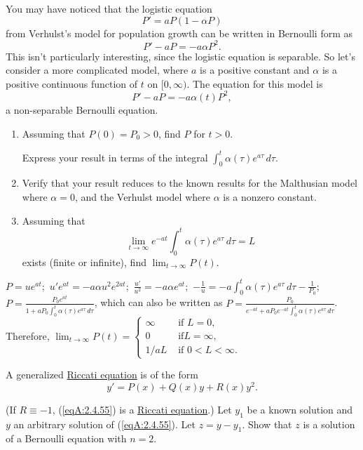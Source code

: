 \documentclass{ximera}
\begin{document}
\begin{problem}\label{exer:2.4.14}
You may have noticed that the logistic equation
$$
P'=aP(1-\alpha P)
$$
from Verhulst's model for population growth can be written in
Bernoulli form as
$$
P'-aP=-a\alpha P^2.
$$
This isn't particularly interesting, since the logistic equation is
separable. So let's consider a more complicated model,
where
$a$ is a positive constant and $\alpha$ is a positive continuous
function of $t$ on $[0,\infty)$. The equation for this model is
$$
P'-aP=-a\alpha(t) P^2,
$$
a non-separable Bernoulli equation.
\begin{enumerate}
\item %
Assuming that $P(0)=P_0>0$, find $P$ for $t>0$. 
\begin{hint}
Express your result in terms of the integral
 $\int_0^t\alpha(\tau)e^{a\tau}\,d\tau$.
 \end{hint}
\item %
Verify that your result reduces to the known results
for the Malthusian model where  $\alpha=0$, and the Verhulst model
where $\alpha$ is a nonzero constant.
\item %
Assuming that
$$
\lim_{t\to\infty}e^{-at}\int_0^t\alpha(\tau)e^{a\tau}\,d\tau=L
$$
exists (finite or infinite), find $\lim_{t\to\infty}P(t)$.
\end{enumerate}



\begin{solution}
    $P=ue^{at}$;\ $u'e^{at}=-a\alpha u^2e^{2at}$;\ $\frac{u'}{
u^2}=-a\alpha e^{at}$;\ $-\frac{1}{
u}=-a\int_0^t\alpha(\tau)e^{a\tau}\,d\tau-\frac{1}{ P_0}$;\;
$P=\frac{P_0e^{at}}{1+aP_0\int_0^t\alpha(\tau)e^{a\tau}\,d\tau}$,
which can also be written as
$P=\frac{P_0}{
e^{-at}+aP_0e^{-at}\int_0^t\alpha(\tau)e^{a\tau}\,d\tau}$.
Therefore, $\lim_{t\to\infty}P(t)=
\left\{\begin{array}{rl}\infty&\mbox{ if }L=0,\\0&\mbox{ if
}L=\infty,\\ 1/aL&\mbox{ if } 0<L<\infty.\end{array}\right.$
\end{solution}
\end{problem}

\begin{problem}\label{exer:2.4.55}
A generalized
\href{http://http://www-history.mcs.st-and.ac.uk/Indexes/Riccati.html}{Riccati equation} is of the form
\begin{equation}\label{eqA:2.4.55}
y'=P(x)+Q(x)y+R(x)y^2.
\end{equation}

(If $R\equiv-1$,  (\ref{eqA:2.4.55}) is a
\href{http://http://www-history.mcs.st-and.ac.uk/Indexes/Riccati.html}
{Riccati equation}.) Let $y_1$ be a known solution and $y$ an arbitrary solution of (\ref{eqA:2.4.55}). Let $z=y-y_1$. Show that $z$ is a
solution of a Bernoulli equation with $n=2$.
\end{problem}
\end{document}
